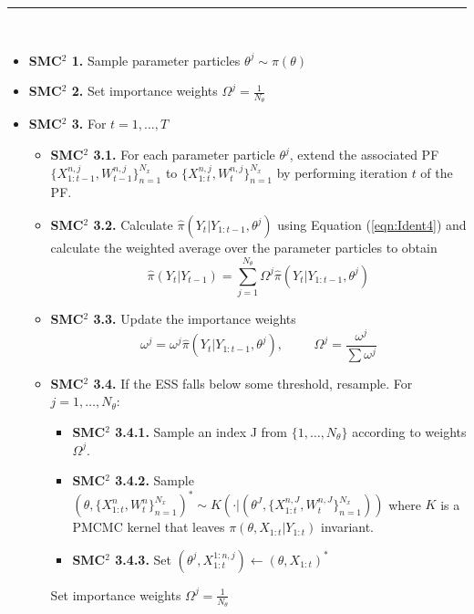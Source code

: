 \documentclass[a4paper,12pt]{article}
\begin{document}
\noindent \rule{\textwidth}{1pt}\\

\begin{itemize}
\item {\bf SMC$^2$ 1.} Sample parameter particles $\theta^j \sim \pi(\theta)$

\item {\bf SMC$^2$ 2.} Set importance weights $ \Omega^j = \frac{1}{N_\theta}$

\item {\bf SMC$^2$ 3.} For $t=1,...,T$

\begin{itemize}

\item {\bf SMC$^2$ 3.1.} For each parameter particle $\theta^j$, extend the associated PF  $\{X_{1:t-1}^{n,j}, W_{t-1}^{n,j}\}_{n=1}^{N_x}$ to  $\{X_{1:t}^{n,j}, W_t^{n,j}\}_{n=1}^{N_x}$ by performing iteration $t$ of the PF.

\item {\bf SMC$^2$ 3.2.} Calculate $\hat{\pi} (Y_t \vert Y_{1:t-1}, \theta^j)$ using Equation (\ref{eqn:Ident4}) and calculate the weighted average over the parameter particles to obtain $$\hat{\pi}(Y_t \vert Y_{t-1}) = \sum_{j=1}^{N_\theta} \Omega^j \hat{\pi} (Y_t \vert Y_{1:t-1}, \theta^j)$$

\item {\bf SMC$^2$ 3.3.} Update the importance weights
\[ \omega^j = \omega^j \hat{\pi} (Y_t \vert Y_{1:t-1}, \theta^j), \hspace{1cm} \Omega^j = \frac{\omega^j}{\sum \omega^j} \]

\item {\bf SMC$^2$ 3.4.} If the ESS falls below some threshold,  resample. For $j=1, \ldots, N_\theta$:

\begin{itemize}

\item {\bf SMC$^2$ 3.4.1.} Sample an index
 J from $\{1, \ldots, N_\theta\}$ %
according to weights $\Omega^j$.

\item {\bf SMC$^2$ 3.4.2.} Sample $\left( \theta, \{X_{1:t}^n, W_t^n\}_{n=1}^{N_x} \right)^{*} \sim K \left(\cdot \vert \left( \theta^J, \{X_{1:t}^{n,J} ,W_t^{n,J}\}_{n=1}^{N_x} \right)\right)$ where $K$ is a PMCMC kernel that leaves $\pi (\theta, X_{1:t} \vert Y_{1:t})$ invariant.

\item {\bf SMC$^2$ 3.4.3.} Set $\left( \theta^j, X_{1:t}^{1:n,j} \right) \leftarrow \left( \theta, X_{1:t} \right)^{*}$



\end{itemize}
Set importance weights
$\Omega^j = \frac{1}{N_\theta}$
\end{itemize}

\end{itemize}
\end{document}
